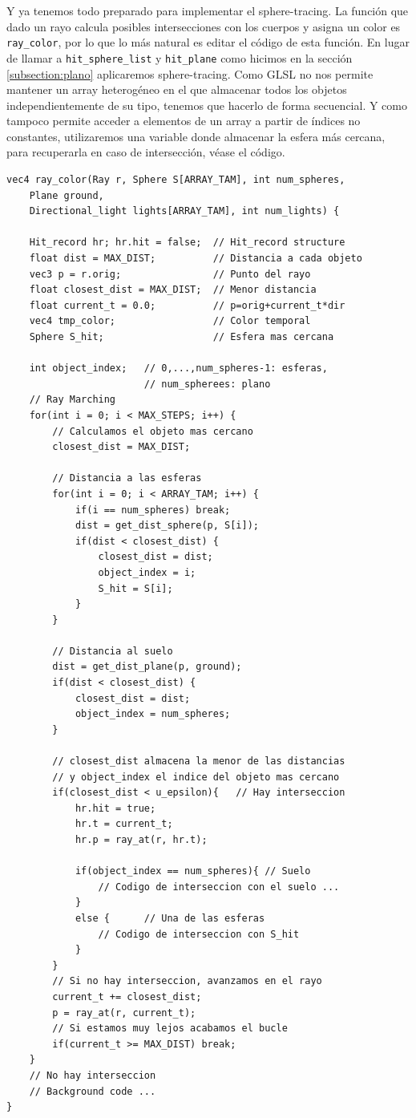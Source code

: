 Y ya tenemos todo preparado para implementar el sphere-tracing. La función que dado un rayo calcula posibles intersecciones con los cuerpos y asigna un color es \verb|ray_color|, por lo que lo más natural es editar el código de esta función. En lugar de llamar a \verb|hit_sphere_list| y \verb|hit_plane| como hicimos en la sección \ref{subsection:plano} aplicaremos sphere-tracing. Como GLSL no nos permite mantener un array heterogéneo en el que almacenar todos los objetos independientemente de su tipo, tenemos que hacerlo de forma secuencial. Y como tampoco permite acceder a elementos de un array a partir de índices no constantes, utilizaremos una variable donde almacenar la esfera más cercana, para recuperarla en caso de intersección, véase el código.

\begin{lstlisting}
vec4 ray_color(Ray r, Sphere S[ARRAY_TAM], int num_spheres, 
    Plane ground,
    Directional_light lights[ARRAY_TAM], int num_lights) {
    
    Hit_record hr; hr.hit = false;  // Hit_record structure
    float dist = MAX_DIST;          // Distancia a cada objeto 
    vec3 p = r.orig;                // Punto del rayo
    float closest_dist = MAX_DIST;  // Menor distancia
    float current_t = 0.0;          // p=orig+current_t*dir
    vec4 tmp_color;                 // Color temporal
    Sphere S_hit;                   // Esfera mas cercana
    
    int object_index;   // 0,...,num_spheres-1: esferas,
                        // num_spherees: plano
    // Ray Marching
    for(int i = 0; i < MAX_STEPS; i++) {
        // Calculamos el objeto mas cercano
        closest_dist = MAX_DIST;

        // Distancia a las esferas
        for(int i = 0; i < ARRAY_TAM; i++) {
            if(i == num_spheres) break;
            dist = get_dist_sphere(p, S[i]);
            if(dist < closest_dist) {
                closest_dist = dist;
                object_index = i;
                S_hit = S[i];
            }
        }

        // Distancia al suelo
        dist = get_dist_plane(p, ground);
        if(dist < closest_dist) {
            closest_dist = dist;
            object_index = num_spheres;
        }
    
        // closest_dist almacena la menor de las distancias
        // y object_index el indice del objeto mas cercano
        if(closest_dist < u_epsilon){   // Hay interseccion
            hr.hit = true;
            hr.t = current_t;
            hr.p = ray_at(r, hr.t);

            if(object_index == num_spheres){ // Suelo
                // Codigo de interseccion con el suelo ...
            }
            else {      // Una de las esferas
                // Codigo de interseccion con S_hit
            }
        }
        // Si no hay interseccion, avanzamos en el rayo
        current_t += closest_dist;
        p = ray_at(r, current_t);
        // Si estamos muy lejos acabamos el bucle
        if(current_t >= MAX_DIST) break;
    }
    // No hay interseccion
    // Background code ...       
}
\end{lstlisting}

